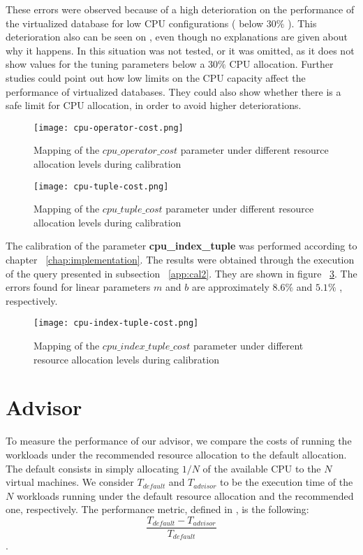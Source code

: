 These errors were observed because of a high deterioration on the performance of the virtualized database for low CPU configurations ( below $30\%$ ). This deterioration also can be seen on \cite{4401021}, even though no explanations are given about why it happens. In \cite{Soror:2008:AVM:1376616.1376711} this situation was not tested, or it was omitted, as it does not show values for the tuning parameters below  a $30\%$ CPU allocation. Further studies could point out how low limits on the CPU capacity affect the performance of virtualized databases. They could also show whether there is a safe limit for CPU allocation, in order to avoid higher deteriorations. 

 
 \begin{figure}[ht]
 \centering
 \texttt{[image: cpu-operator-cost.png]}
 \caption{Mapping of the $cpu\_operator\_cost$ parameter under different resource allocation levels during calibration}
 \label{fig:cpuop}
 \end{figure} 
% 
% 
 \begin{figure}[ht]
 \centering
 \texttt{[image: cpu-tuple-cost.png]}
 \caption{Mapping of the $cpu\_tuple\_cost$ parameter under different resource allocation levels during calibration}
 \label{fig:cputp}
 \end{figure} 
 
 The calibration of the parameter \textbf{cpu\_index\_tuple} was performed according to chapter ~\ref{chap:implementation}. The results were obtained through the execution of the query presented in subsection ~\ref{app:cal2}. They are shown in figure ~\ref{fig:cpuip}. The errors found for linear parameters $m$ and $b$ are approximately $8.6\%$ and $5.1\%$ , respectively.

 \begin{figure}[ht]
 \centering
 \texttt{[image: cpu-index-tuple-cost.png]}
 \caption{Mapping of the $cpu\_index\_tuple\_cost$ parameter under different resource allocation levels during calibration}
 \label{fig:cpuip}
 \end{figure} 
 
 \section{Advisor}
 

 
 To measure the performance of our advisor, we compare the costs of running the workloads under the recommended resource allocation to the default allocation. The default consists in simply allocating $1/N$ of the available CPU to the $N$ virtual machines. We consider $T_{default}$ and $T_{advisor}$ to be the execution time of the $N$ workloads running under the default resource allocation and the recommended one, respectively. The performance metric, defined in \cite{Soror:2008:AVM:1376616.1376711}, is the following:
 \[
  \frac{T_{default}-T_{advisor}}{T_{default}}
 \]
.
